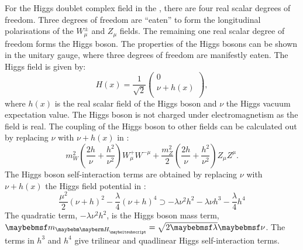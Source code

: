 
For the Higgs doublet complex field in the \SM, there are four real scalar degrees of freedom. Three degrees of freedom are ``eaten'' to form the longitudinal polarisations of the $W^{\pm}_\mu$ and $Z_\mu$ fields. The remaining one real scalar degree of freedom forms the Higgs boson. The properties of the Higgs bosons can be shown in the unitary gauge, where three degrees of freedom are manifestly eaten. The Higgs field is given by:
\begin{equation}
H(x) = \frac{1}{\sqrt{2}}
 \begin{pmatrix}
  0 \\
  \nu + h(x) \\
 \end{pmatrix},
\end{equation}
where $h(x)$ is the real scalar field of the Higgs boson and $\nu$ the Higgs vacuum expectation value. The Higgs boson is not charged under electromagnetism as the field is real. The coupling of the Higgs boson to other fields  can be calculated out by replacing $\nu$  with $\nu + h(x)$ in : 
\begin{equation}
m^2_W\left(\frac{2h}{\nu} + \frac{{h}^2}{\nu^2}\right)W^+_{\mu}W^{-\mu} + \frac{m^2_Z}{2}\left(\frac{2h}{\nu} + \frac{{h}^2}{\nu^2}  \right)Z_{\mu}Z^{\mu}.
\label{eq:theoryHiggsBosonic}
\end{equation}
The Higgs boson self-interaction terms are obtained  by replacing $\nu$  with $\nu + h(x)$  the Higgs field potential in :
\begin{equation}
\frac{\mu^2}{2}\left(\nu+h\right)^2 - \frac{\lambda}{4}\left(\nu+h\right)^4 \supset -\lambda\nu^2{h}^2-\lambda\nu{h}^3 - \frac{\lambda}{4}h^4 %
\label{eq:theoryHiggsSelfCoupling}
\end{equation}
The quadratic term, $-\lambda\nu^2{h}^2$, is the Higgs boson mass term, $\Hmass=\sqrt{2\lambda}\nu$. The terms in $h^3$ and $h^4$ give trilinear and quadlinear Higgs self-interaction terms.

